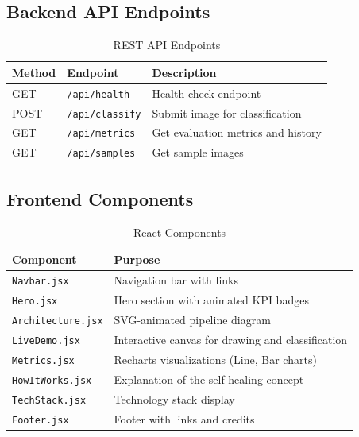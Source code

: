 \documentclass[11pt,a4paper]{article}
\begin{document}
\subsection{Backend API Endpoints}

\begin{table}[H]
    \centering
    \caption{REST API Endpoints}
    \label{tab:api-endpoints}
    \begin{tabular}{llp{6cm}}
        \toprule
        \textbf{Method} & \textbf{Endpoint} & \textbf{Description} \\
        \midrule
        GET & \texttt{/api/health} & Health check endpoint \\
        POST & \texttt{/api/classify} & Submit image for classification \\
        GET & \texttt{/api/metrics} & Get evaluation metrics and history \\
        GET & \texttt{/api/samples} & Get sample images \\
        \bottomrule
    \end{tabular}
\end{table}

\subsection{Frontend Components}

\begin{table}[H]
    \centering
    \caption{React Components}
    \label{tab:react-components}
    \begin{tabular}{lp{8cm}}
        \toprule
        \textbf{Component} & \textbf{Purpose} \\
        \midrule
        \texttt{Navbar.jsx} & Navigation bar with links \\
        \texttt{Hero.jsx} & Hero section with animated KPI badges \\
        \texttt{Architecture.jsx} & SVG-animated pipeline diagram \\
        \texttt{LiveDemo.jsx} & Interactive canvas for drawing and classification \\
        \texttt{Metrics.jsx} & Recharts visualizations (Line, Bar charts) \\
        \texttt{HowItWorks.jsx} & Explanation of the self-healing concept \\
        \texttt{TechStack.jsx} & Technology stack display \\
        \texttt{Footer.jsx} & Footer with links and credits \\
        \bottomrule
    \end{tabular}
\end{table}
\end{document}
